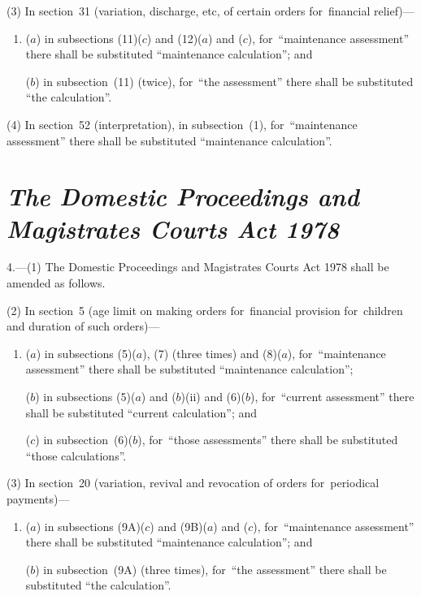 \documentclass[12pt,a4paper]{article}
\begin{document}
(3) In section~31 (variation, discharge, etc, of certain orders for~financial relief)—
\begin{enumerate}\item[]
($a$) in subsections (11)($c$)  and (12)($a$)  and ($c$), for~“maintenance assessment” there shall be substituted “maintenance calculation”; and

($b$) in subsection~(11) (twice), for~“the assessment” there shall be substituted “the calculation”.
\end{enumerate}

(4) In section~52 (interpretation), in subsection~(1), for~“maintenance assessment” there shall be substituted “maintenance calculation”.


\section*{\itshape The Domestic Proceedings and Magistrates Courts Act 1978}

4.---(1) The Domestic Proceedings and Magistrates Courts Act 1978 shall be amended as follows.

(2) In section~5 (age limit on making orders for~financial provision for~children and duration of such orders)—
\begin{enumerate}\item[]
($a$) in subsections (5)($a$), (7)  (three times) and (8)($a$), for~“maintenance assessment” there shall be substituted “maintenance calculation”;

($b$) in subsections (5)($a$)  and ($b$)(ii)  and (6)($b$), for~“current assessment” there shall be substituted “current calculation”; and

($c$) in subsection~(6)($b$), for~“those assessments” there shall be substituted “those calculations”.
\end{enumerate}

(3) In section~20 (variation, revival and revocation of orders for~periodical payments)—
\begin{enumerate}\item[]
($a$) in subsections (9A)($c$)  and (9B)($a$)  and ($c$), for~“maintenance assessment” there shall be substituted “maintenance calculation”; and

($b$) in subsection~(9A) (three times), for~“the assessment” there shall be substituted “the calculation”.
\end{enumerate}
\end{document}
